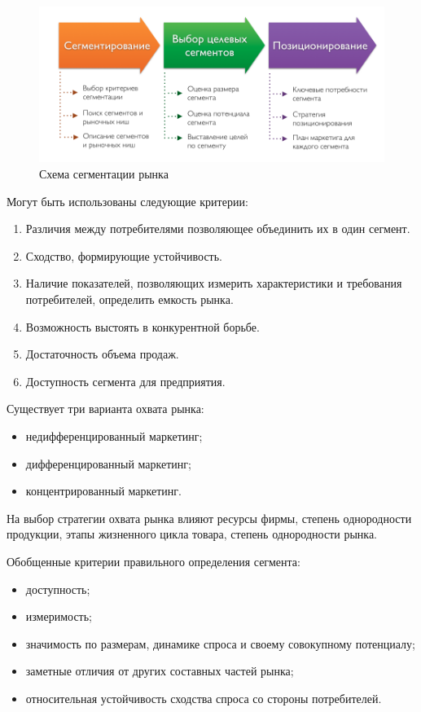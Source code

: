 \documentclass[a4paper,12pt,oneside,final]{extarticle}
\makeatletter
\numberwithin{equation}{section}
\def\maxwidth#1{\ifdim\Gin@nat@width>#1 #1\else\Gin@nat@width\fi}
\makeatother
\begin{document}
\begin{figure}[h]
	\centering
	\includegraphics[width=\maxwidth{\textwidth}]{management-figures/marketing_segmentation_process}
	\caption{Схема сегментации рынка}
\end{figure}

Могут быть использованы следующие критерии:
\begin{enumerate}
	\item Различия между потребителями позволяющее объединить их в один сегмент.
	\item Сходство, формирующие устойчивость.
	\item Наличие показателей, позволяющих измерить характеристики и требования потребителей, определить емкость рынка.
	\item Возможность выстоять в конкурентной борьбе.
	\item Достаточность объема продаж.
	\item Доступность сегмента для предприятия.
\end{enumerate}

Существует три варианта охвата рынка:
\begin{itemize}
	\item недифференцированный маркетинг;
	\item дифференцированный маркетинг;
	\item концентрированный маркетинг.
\end{itemize}

На выбор стратегии охвата рынка влияют ресурсы фирмы, степень однородности продукции, этапы жизненного цикла товара, степень однородности рынка.

Обобщенные критерии правильного определения сегмента:
\begin{itemize}
\item доступность;
\item измеримость;
\item значимость по размерам, динамике спроса и своему совокупному потенциалу;
\item заметные отличия от других составных частей рынка;
\item относительная устойчивость сходства спроса со стороны потребителей.
\end{itemize}
\end{document}
